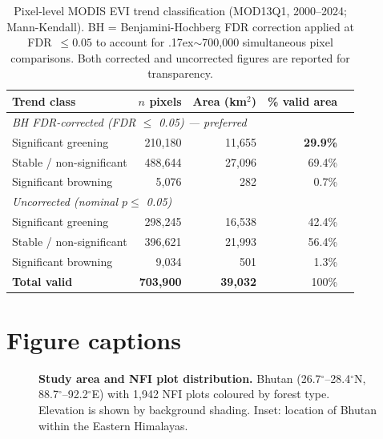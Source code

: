 \documentclass[review,12pt,a4paper]{elsarticle}
\begin{document}
\begin{table}[htbp]
\caption{Pixel-level MODIS EVI trend classification (MOD13Q1, 2000--2024;
Mann-Kendall). BH = Benjamini-Hochberg FDR correction applied at
FDR~$\leq 0.05$ to account for {\raise.17ex\hbox{$\scriptstyle\sim$}}700{,}000 simultaneous pixel comparisons.
Both corrected and uncorrected figures are reported for transparency.}
\label{tab:evi}
\centering
\begin{tabular}{lrrrr}
\toprule
Trend class & $n$ pixels & Area (km$^2$) & \% valid area \\
\midrule
\multicolumn{4}{l}{\textit{BH FDR-corrected (FDR $\leq$ 0.05) --- preferred}} \\
\quad Significant greening & 210{,}180 & 11{,}655 & \textbf{29.9\%} \\
\quad Stable / non-significant & 488{,}644 & 27{,}096 & 69.4\% \\
\quad Significant browning  & 5{,}076   & 282      & 0.7\%  \\
\midrule
\multicolumn{4}{l}{\textit{Uncorrected (nominal $p \leq$ 0.05)}} \\
\quad Significant greening & 298{,}245 & 16{,}538 & 42.4\% \\
\quad Stable / non-significant & 396{,}621 & 21{,}993 & 56.4\% \\
\quad Significant browning  & 9{,}034   & 501      & 1.3\%  \\
\midrule
\textbf{Total valid} & \textbf{703{,}900} & \textbf{39{,}032} & 100\% \\
\bottomrule
\end{tabular}
\end{table}


\clearpage
\section*{Figure captions}

\begin{figure}[htbp]
  \centering
  \caption{\textbf{Study area and NFI plot distribution.}
    Bhutan (26.7$^\circ$--28.4$^\circ$N, 88.7$^\circ$--92.2$^\circ$E)
    with 1{,}942 NFI plots coloured by forest type. Elevation is shown
    by background shading. Inset: location of Bhutan within the Eastern
    Himalayas.}
  \label{fig:map}
\end{figure}
\end{document}

